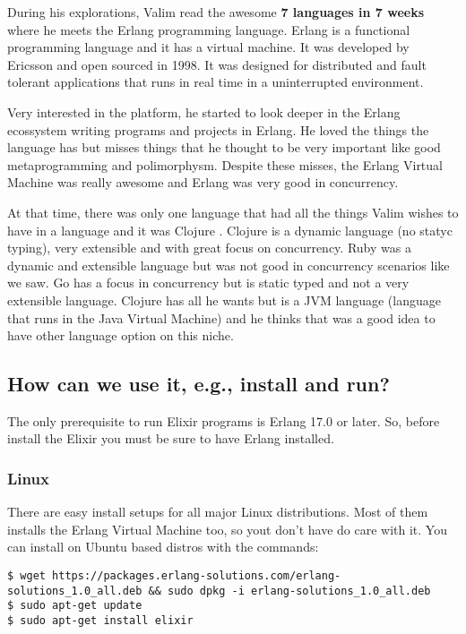 During his explorations, Valim read the awesome \textbf{7 languages in 7 weeks}
\cite{5_10} where he meets the Erlang \cite{5_11} programming language. Erlang
is a functional programming language and it has a virtual machine. It was
developed by Ericsson \cite{5_12} and open sourced in 1998. It was designed for
distributed and fault tolerant applications that runs in real time in a
uninterrupted environment.

Very interested in the platform, he started to look deeper in the Erlang
ecossystem writing programs and projects in Erlang. He loved the things the
language has but misses things that he thought to be very important like good
metaprogramming and polimorphysm. Despite these misses, the Erlang Virtual
Machine was really awesome and Erlang was very good in concurrency.

At that time, there was only one language that had all the things Valim wishes
to have in a language and it was Clojure \cite{5_13}.
Clojure is a dynamic language (no statyc typing), very extensible and with great
focus on concurrency. Ruby was a dynamic and extensible language but was not
good in concurrency scenarios like we saw. Go \cite{5_14}
has a focus in concurrency but is static typed and not a very extensible
language. Clojure has all he wants but is a JVM language (language that runs in
the Java Virtual Machine) and he thinks that was a good idea to have other
language option on this niche.

\subsection{How can we use it, e.g., install and run?}

The only prerequisite to run Elixir programs is Erlang 17.0 or later. So, before
install the Elixir you must be sure to have Erlang installed.

\subsubsection{Linux}

There are easy install setups for all major Linux distributions. Most of them
installs the Erlang Virtual Machine too, so yout don't have do care with it. You
can install on Ubuntu based distros with the commands:

\begin{verbatim}
$ wget https://packages.erlang-solutions.com/erlang-solutions_1.0_all.deb && sudo dpkg -i erlang-solutions_1.0_all.deb
$ sudo apt-get update
$ sudo apt-get install elixir
\end{verbatim}


